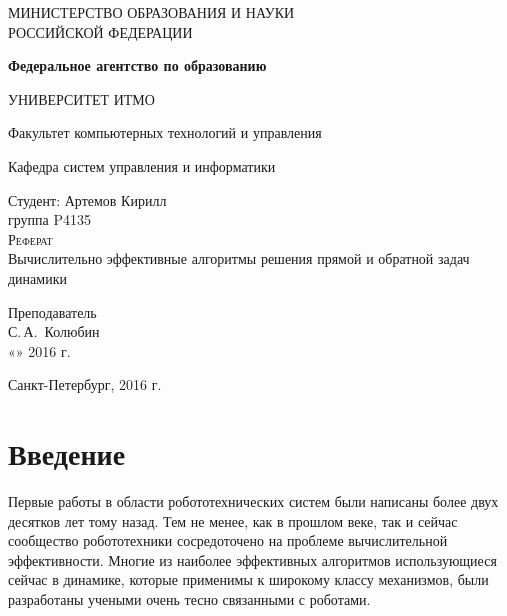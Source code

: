 \documentclass[a4paper,14pt]{extreport}
\begin{document}
\renewcommand{\refname}{Литература}
\begin{titlepage}
	\begin{center}
		\large
		МИНИСТЕРСТВО ОБРАЗОВАНИЯ И НАУКИ\\ РОССИЙСКОЙ ФЕДЕРАЦИИ
		
		\textbf{Федеральное агентство по образованию}
		\vspace{0.5cm}
		
		УНИВЕРСИТЕТ ИТМО
		\vspace{0.25cm}
		
		Факультет компьютерных технологий и управления
		
		Кафедра систем управления и информатики
		\vfill
		
		
		Студент: Артемов Кирилл\\
		группа P4135\\
		
		\textsc{\LARGE Реферат}\\[5mm]
		
		{\LARGE Вычислительно эффективные алгоритмы решения прямой и обратной задач динамики}	\bigskip
		
	\end{center}
	\vfill
	
	\newlength{\ML}
	\hfill\begin{minipage}{0.4\textwidth}
		Преподаватель\\
		\underline{\hspace{\ML}} С.\,А.~Колюбин\\
		«\underline{\hspace{0.7cm}}» \underline{\hspace{2cm}} 2016 г.
	\end{minipage}%
	\bigskip
	
	\vfill
	
	\begin{center}
		Санкт-Петербург, 2016 г.
	\end{center}
\end{titlepage}

\tableofcontents
\newpage

\section{Введение}
Первые работы в области робототехнических систем были написаны более двух десятков лет тому назад. Тем не менее, как в прошлом веке, так и сейчас сообщество робототехники сосредоточено на проблеме вычислительной эффективности. Многие из наиболее эффективных алгоритмов использующиеся сейчас в динамике, которые применимы к широкому классу механизмов, были разработаны учеными очень тесно связанными с роботами. 
\end{document}
